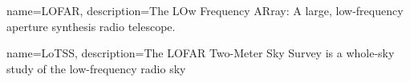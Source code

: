 
\makeglossaries

{
    name=LOFAR,
    description={The LOw Frequency ARray: A large, low-frequency aperture synthesis radio telescope.} 
}

{
    name=LoTSS,
    description={The LOFAR Two-Meter Sky Survey is a whole-sky study of the low-frequency radio sky}
}
